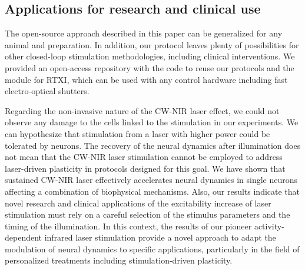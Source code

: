 \subsection{Applications for research and clinical use}
The open-source approach described in this paper can be generalized for any animal and preparation. In addition, our protocol leaves plenty of possibilities for other closed-loop stimulation methodologies, including clinical interventions. We provided an open-access repository with the code to reuse our protocols and the module for RTXI, which can be used with any control hardware including fast electro-optical shutters. 


Regarding the non-invasive nature of the CW-NIR laser effect, we could not observe any damage to the cells linked to the stimulation in our experiments. We can hypothesize that stimulation from a laser with higher power could be tolerated by neurons. The recovery of the neural dynamics after illumination does not mean that the CW-NIR laser stimulation cannot be employed to address laser-driven plasticity in protocols designed for this goal. We have shown that sustained CW-NIR laser effectively accelerates neural dynamics in single neurons affecting a combination of biophysical mechanisms. Also, our results indicate that novel research and clinical applications of the excitability increase of laser stimulation must rely on a careful selection of the stimulus parameters and the timing of the illumination. In this context, the results of our pioneer activity-dependent infrared laser stimulation provide a novel approach to adapt the modulation of neural dynamics to specific applications, particularly in the field of personalized treatments including stimulation-driven plasticity.


